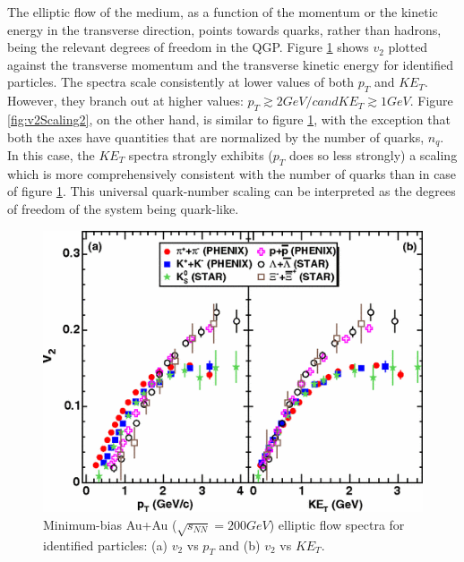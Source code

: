 The elliptic flow of the medium, as a function of the momentum or the kinetic energy in the transverse direction, points towards quarks, rather than hadrons, being the relevant degrees of freedom in the QGP. Figure \ref{fig:v2Scaling1} shows $v_{2}$ plotted against the transverse momentum and the transverse kinetic energy for identified particles. The spectra scale consistently at lower values of both $p_{T}$ and $KE_{T}$. However, they branch out at higher values: $p_{T} \gtrsim 2 GeV/c and KE_{T} \gtrsim 1 GeV$. Figure \ref{fig:v2Scaling2}, on the other hand, is similar to figure \ref{fig:v2Scaling1}, with the exception that both the axes have quantities that are normalized by the number of quarks, $n_{q}$. In this case, the $KE_{T}$ spectra strongly exhibits ($p_{T}$ does so less strongly) a scaling which is more comprehensively consistent with the number of quarks than in case of figure \ref{fig:v2Scaling1}. This universal quark-number scaling can be interpreted as the degrees of freedom of the system being quark-like.\cite{2007PhRvL..98p2301A}
	\begin{figure}[h]
	  \centering
	  \includegraphics[width=4.5in]{figures/v2Scaling1.png}
	  \caption{Minimum-bias Au+Au ($\sqrt{s_{NN}} = 200 GeV$) elliptic flow spectra for identified particles: (a) $v_{2}$ vs $p_{T}$ and (b) $v_{2}$ vs $KE_{T}$.\cite{2007PhRvL..98p2301A}}\label{fig:v2Scaling1}
	\end{figure}
	
